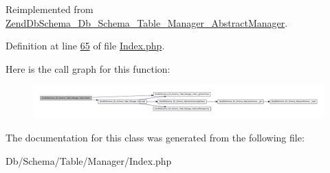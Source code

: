 \-Reimplemented from \hyperlink{classZendDbSchema__Db__Schema__Table__Manager__AbstractManager_a2772bff0f798fb0be284a8e92d47a39e}{\-Zend\-Db\-Schema\-\_\-\-Db\-\_\-\-Schema\-\_\-\-Table\-\_\-\-Manager\-\_\-\-Abstract\-Manager}.



\-Definition at line \hyperlink{Manager_2Index_8php_source_l00065}{65} of file \hyperlink{Manager_2Index_8php_source}{\-Index.\-php}.



\-Here is the call graph for this function\-:\nopagebreak
\begin{figure}[H]
\begin{center}
\leavevmode
\includegraphics[width=350pt]{classZendDbSchema__Db__Schema__Table__Manager__Index_ae736a0eff081db2c7de80e635021ccc9_cgraph}
\end{center}
\end{figure}




\-The documentation for this class was generated from the following file\-:\begin{DoxyCompactItemize}
\item 
\-Db/\-Schema/\-Table/\-Manager/\-Index.\-php\end{DoxyCompactItemize}
